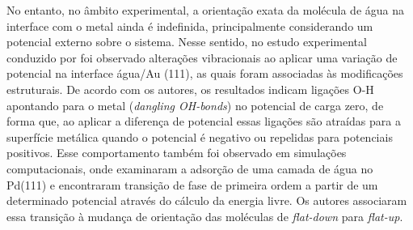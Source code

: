 No entanto, no âmbito experimental, a orientação exata da molécula de água na interface com o metal ainda é indefinida, principalmente considerando um potencial externo sobre o sistema. Nesse sentido, no estudo experimental conduzido por \citeauthor{sfg_kramer} foi observado alterações vibracionais ao aplicar uma variação de potencial na interface água/Au (111), as quais foram associadas às modificações estruturais. De acordo com os autores, os resultados indicam ligações O-H apontando para o metal (\textit{dangling OH-bonds}) no potencial de carga zero, de forma que, ao aplicar a diferença de potencial essas ligações são atraídas para a superfície metálica quando o potencial é negativo ou repelidas para potenciais positivos. Esse comportamento também foi observado em simulações computacionais, onde \citeauthor{pd_bias_layer} examinaram a adsorção de uma camada de água no Pd(111) e encontraram transição de fase de primeira ordem a partir de um determinado potencial através do cálculo da energia livre. Os autores associaram essa transição à mudança de orientação das moléculas de \textit{flat-down} para \textit{flat-up}.
